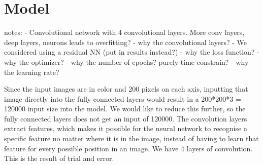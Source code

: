 \section{Model}
notes:
- Convolutional network with 4 convolutional layers. More conv layers, deep layers, neurons leads to overfitting?
- why the convolutional layers?
- We considered using a residual NN (put in results instead?)
- why the loss function?
- why the optimizer?
- why the number of epochs? purely time constrain?
- why the learning rate?

Since the input images are in color and 200 pixels on each axis, inputting that image directly into the fully connected layers would result in a 200*200*3 = 120000 input size into the model. We would like to reduce this further, so the fully connected layers does not get an input of 120000. The convolution layers extract features, which makes it possible for the neural network to recognise a specific feature no matter where it is in the image, instead of having to learn that feature for every possible position in an image. We have 4 layers of convolution. This is the result of trial and error.
